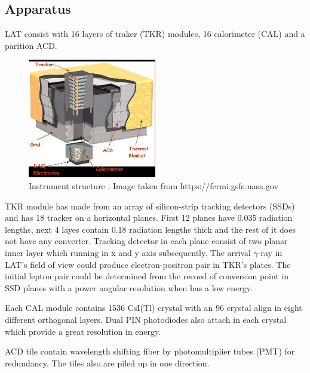 \subsection{Apparatus}
LAT consist with 16 layers of traker (TKR) modules, 16 calorimeter (CAL) and a parition ACD. 

\begin{figure}[h!]
  \centering
    \includegraphics[width=0.5\textwidth]{img/LATStructure}
    \caption{Instrument structure : Image taken from https://fermi.gsfc.nasa.gov}
\end{figure}

\par TKR module has made from an array of silicon-strip tracking detectors (SSDs) and has 18 tracker on a horizontal planes. First 12 planes have 0.035 radiation lengths, next 4 layes contain 0.18 radiation lengths thick and the rest of it does not have any converter.
Tracking detector in each plane consist of two planar inner layer which running in x and y axis subsequently. The arrival $\gamma$-ray in LAT's field of view could produce electron-positron pair in TKR's plates.
The initial lepton pair could be determined from the recoed of conversion point in SSD planes with a power angular resolution when has a low energy.

\par Each CAL module contains 1536 CsI(Tl) crystal with an 96 crystal align in eight different orthogonal layers.
Dual PIN photodiodes also attach in each crystal which provide a great resolution in energy.

\par ACD tile contain wavelength shifting fiber by photomultiplier tubes (PMT) for redundancy. 
The tiles also are piled up in one direction.

 


